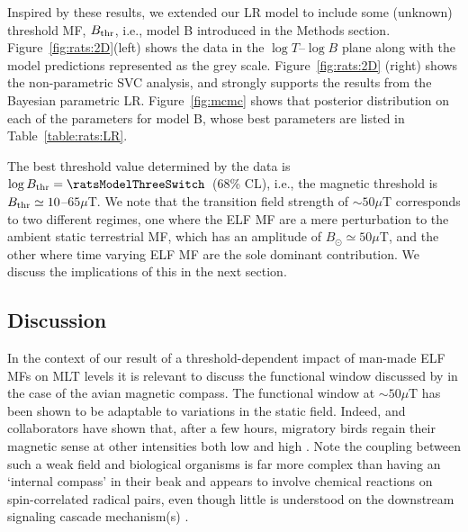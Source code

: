 \documentclass[a4]{article}
\begin{document}
 
Inspired by these results, we extended our LR model  to include  some (unknown) threshold MF, $B_{\rm thr}$, i.e., model B introduced in the Methods section. Figure~\ref{fig:rats:2D}(left) shows the data in the $\log T$--$\log B$ plane along with the model predictions represented as the grey scale. 
Figure~\ref{fig:rats:2D} (right) shows  the non-parametric SVC analysis, and strongly supports the results from the Bayesian parametric LR.
 Figure~\ref{fig:mcmc} shows that posterior distribution on each of the parameters for model B, whose best parameters are listed in Table~\ref{table:rats:LR}. 
 
 The best threshold value determined by the data is $\log B_{\rm thr}=\ratsModelThreeSwitch$\ratsModelThreeSwitchErr\ (68\% CL), i.e., the magnetic threshold is $B_{\rm thr}\simeq10$--$65\mu$T. %
 We note that the transition field  strength of $\sim50\mu$T   corresponds to
two different regimes, one where the ELF MF are a mere perturbation to the ambient static terrestrial MF, which has
an amplitude of $B_{\odot}\simeq50\mu$T, and the other where time varying ELF MF are the sole dominant contribution.  
We discuss the implications of this in the next section.


\subsection*{Discussion}
 \label{section:discussion}
 

In the context of our result of a threshold-dependent impact of man-made ELF MFs on MLT levels 
 it is relevant to  discuss the functional window discussed  by \citet{Wiltschko2014} 
in the case of the   avian magnetic compass. The functional window  at $\sim50\mu$T has been shown to be adaptable to variations in the static field.
Indeed, \citet{Wiltschko2014} and collaborators have shown that, after a few hours, migratory birds regain their magnetic sense at other intensities both low \citep[e.g.][as low as 4$\mu$T]{Winklhofer2013} and high \citep[][up to 92$\mu$T]{Wiltschko2006}. Note the coupling between such a weak field and biological organisms \citep[e.g.][]{ Kattnig2017,Hore2016,Ritz2000,Vanderstraeten2010,Vanderstraeten2018} is far more complex than having  an `internal compass' in their beak and appears to involve chemical reactions on spin-correlated radical pairs, even though  little is understood on the downstream signaling cascade mechanism(s)  \citep[as reviewed in][]{Nordmann2017}.
 
\end{document}
